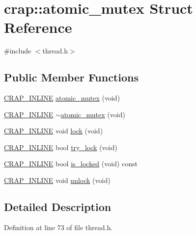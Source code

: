 \hypertarget{structcrap_1_1atomic__mutex}{}\section{crap\+:\+:atomic\+\_\+mutex Struct Reference}
\label{structcrap_1_1atomic__mutex}


{\ttfamily \#include $<$thread.\+h$>$}

\subsection*{Public Member Functions}
\begin{DoxyCompactItemize}
\item 
\hyperlink{config__x86_8h_a5a40526b8d842e7ff731509998bb0f1c}{C\+R\+A\+P\+\_\+\+I\+N\+L\+I\+N\+E} \hyperlink{structcrap_1_1atomic__mutex_a54cae5ed28489fe821b365474dba7829}{atomic\+\_\+mutex} (void)
\item 
\hyperlink{config__x86_8h_a5a40526b8d842e7ff731509998bb0f1c}{C\+R\+A\+P\+\_\+\+I\+N\+L\+I\+N\+E} \hyperlink{structcrap_1_1atomic__mutex_adda57df22d546931c28a96065a82639d}{$\sim$atomic\+\_\+mutex} (void)
\item 
\hyperlink{config__x86_8h_a5a40526b8d842e7ff731509998bb0f1c}{C\+R\+A\+P\+\_\+\+I\+N\+L\+I\+N\+E} void \hyperlink{structcrap_1_1atomic__mutex_a9beac3f229645619a515a27073e00a72}{lock} (void)
\item 
\hyperlink{config__x86_8h_a5a40526b8d842e7ff731509998bb0f1c}{C\+R\+A\+P\+\_\+\+I\+N\+L\+I\+N\+E} bool \hyperlink{structcrap_1_1atomic__mutex_a5cd53b9c6d65fe8c20c5e3a0efe1f3f8}{try\+\_\+lock} (void)
\item 
\hyperlink{config__x86_8h_a5a40526b8d842e7ff731509998bb0f1c}{C\+R\+A\+P\+\_\+\+I\+N\+L\+I\+N\+E} bool \hyperlink{structcrap_1_1atomic__mutex_a7131974f75e49f901285834ba96010a6}{is\+\_\+locked} (void) const 
\item 
\hyperlink{config__x86_8h_a5a40526b8d842e7ff731509998bb0f1c}{C\+R\+A\+P\+\_\+\+I\+N\+L\+I\+N\+E} void \hyperlink{structcrap_1_1atomic__mutex_a1c239a2b3ceef7083189c3523ad5df52}{unlock} (void)
\end{DoxyCompactItemize}


\subsection{Detailed Description}


Definition at line 73 of file thread.\+h.




